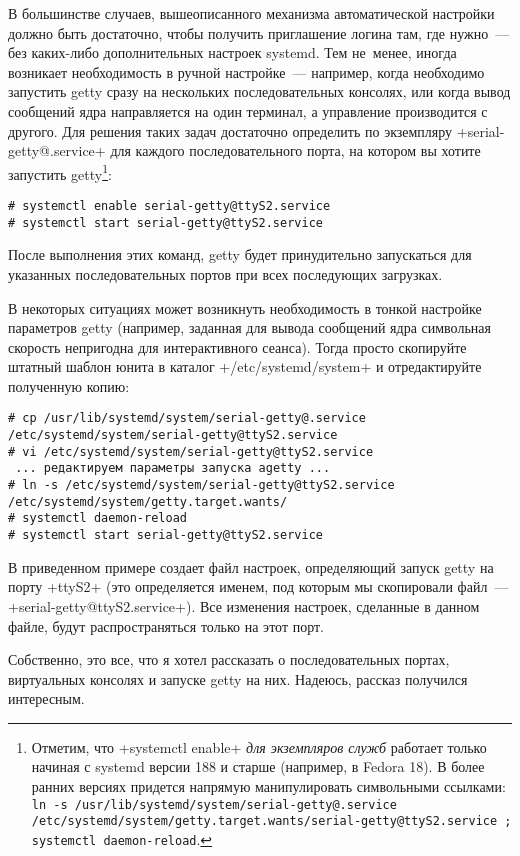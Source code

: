 \documentclass[10pt,oneside,a4paper]{article}
\begin{document}
В большинстве случаев, вышеописанного механизма автоматической настройки должно
быть достаточно, чтобы получить приглашение логина там, где нужно~--- без
каких-либо дополнительных настроек systemd. Тем не~менее, иногда возникает
необходимость в ручной настройке~--- например, когда необходимо запустить getty
сразу на нескольких последовательных консолях, или когда вывод сообщений ядра
направляется на один терминал, а управление производится с другого. Для решения
таких задач достаточно определить по экземпляру +serial-getty@.service+ для
каждого последовательного порта, на котором вы хотите запустить
getty\footnote{Отметим, что +systemctl enable+ \emph{для экземпляров служб}
работает только начиная с systemd версии 188 и старше (например, в Fedora 18). В
более ранних версиях придется напрямую манипулировать символьными ссылками:
\texttt{ln -s /usr/lib/systemd/system/serial-getty@.service
/etc/systemd/system/getty.target.wants/serial-getty@ttyS2.service ; systemctl
daemon-reload}.}:
\begin{Verbatim}
# systemctl enable serial-getty@ttyS2.service
# systemctl start serial-getty@ttyS2.service
\end{Verbatim}
После выполнения этих команд, getty будет принудительно запускаться для
указанных последовательных портов при всех последующих загрузках.

В некоторых ситуациях может возникнуть необходимость в тонкой настройке
параметров getty (например, заданная для вывода сообщений ядра символьная
скорость непригодна для интерактивного сеанса). Тогда просто скопируйте штатный
шаблон юнита в каталог +/etc/systemd/system+ и отредактируйте полученную копию:
\begin{Verbatim}
# cp /usr/lib/systemd/system/serial-getty@.service /etc/systemd/system/serial-getty@ttyS2.service
# vi /etc/systemd/system/serial-getty@ttyS2.service
 ... редактируем параметры запуска agetty ...
# ln -s /etc/systemd/system/serial-getty@ttyS2.service /etc/systemd/system/getty.target.wants/
# systemctl daemon-reload
# systemctl start serial-getty@ttyS2.service
\end{Verbatim}
В приведенном примере создает файл настроек, определяющий запуск getty на порту
+ttyS2+ (это определяется именем, под которым мы скопировали файл~---
+serial-getty@ttyS2.service+). Все изменения настроек, сделанные в данном файле,
будут распространяться только на этот порт.

Собственно, это все, что я хотел рассказать о последовательных портах,
виртуальных консолях и запуске getty на них. Надеюсь, рассказ получился
интересным.
\end{document}
